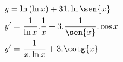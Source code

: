 \begin{ex}
\begin{align}
&y=\ln{(\ln{x})}+31.\ln{\sen{x}}\nonumber\\
&y'=\frac{1}{\ln{x}}.\frac{1}{x}+3.\frac{1}{\sen{x}}.\cos{x}\nonumber\\
&y'=\frac{1}{x.\ln{x}}+3.\cotg{x}\nonumber
\end{align}
\end{ex}
